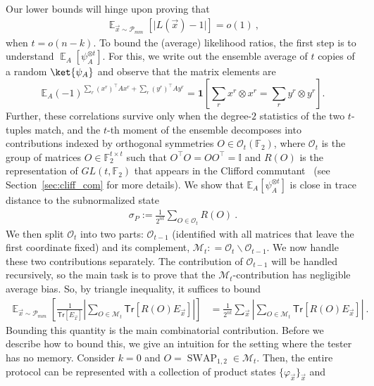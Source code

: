 \documentclass[11pt]{article}
\newcommand{\E}{\mathop{\mathbb{E}}}
\newcommand{\Exp}{{\mathbb{E}}}
\newcommand{\id}{\ensuremath{\mathbb{I}}}
\newcommand{\Tr}{\mathsf{Tr}}
\newcommand{\F}{\mathbb{F}}
\newcommand{\Oc}{\mathcal{O}}
\newcommand{\SWAP}{\operatorname{SWAP}}
\begin{document}
Our lower bounds will hinge upon proving that
\begin{align}
    \E_{\vec{x} \sim \mathcal{P}_{mm}}\left[ \vert L(\vec{x}) - 1\vert \right] = o(1)\ ,
\end{align}
when $t=o(n-k)$.  To bound the (average) likelihood ratios, the first step is to understand $\E_A[\psi_A^{\otimes t}]$. For this, we write out the ensemble average of $t$ copies of a random $\ket{\psi_A}$ and observe that the matrix elements are
    $$
        \mathbb E_A
        (-1)^{
            \sum_r (x^r)^\top A x^r
            +
            \sum_r (y^r)^\top A y^r
        }
        =
        \mathbf 1\!\left[
            \sum_r x^r\otimes x^r
            =
            \sum_r y^r\otimes y^r
        \right].
    $$
    Further, these correlations survive only when the degree-$2$ statistics of the two $t$-tuples match, and the $t$-th moment of the ensemble decomposes     into contributions indexed by orthogonal symmetries
    $O\in \Oc_t(\mathbb F_2)$, where $\Oc_t$ is the group of matrices $O \in \F_2^{t \times t}$ such that $O^\top O = O O^\top = \id$ and $R(O)$ is the representation of $GL(t,\F_2)$ that appears in the Clifford commutant~\cite{gross2021schur} (see Section~\ref{sec:cliff_com} for more details). We show that $\Exp_A[\psi_A^{\otimes t}]$ is close in trace distance to the subnormalized state
\begin{align}
    \sigma_P := \frac{1}{2^{nt}}\sum_{O \in \Oc_{t}}R(O)\ .
\end{align}
 We then split $\Oc_t$ into two parts: $\Oc_{t-1}$ (identified with all matrices that leave the first coordinate fixed) and its complement, $\mathcal M_t : = \Oc_t \backslash \Oc_{t-1}$. We now handle these two contributions separately.  The contribution of $\mathcal O_{t-1}$ will be handled recursively, so the main task is to prove that the $\mathcal M_t$-contribution has negligible average bias. So, by triangle inequality, it suffices to bound
\begin{align}
    \E_{\vec{x} \sim \mathcal{P}_{mm}}\left[ \frac{1}{\Tr[E_{\vec{x}}]}\left\vert \sum_{O \in \mathcal M_t} \Tr[R(O) E_{\vec{x}}]\right\vert \right] & = \frac{1}{2^{nt}}\sum_{\vec{x}} \left\vert \sum_{O \in \mathcal M_t} \Tr[R(O) E_{\vec{x}}]\right\vert\ .
\end{align}
Bounding this quantity is the main combinatorial contribution. Before we describe how to bound this, we give an intuition for the setting where the tester has no memory. Consider $k=0$ and $O=\SWAP_{1,2} \in \mathcal M_t$. Then, the entire protocol can be represented with a collection of product states $\{\varphi_{\vec{x}}\}_{\vec{x}}$ and 
\end{document}
